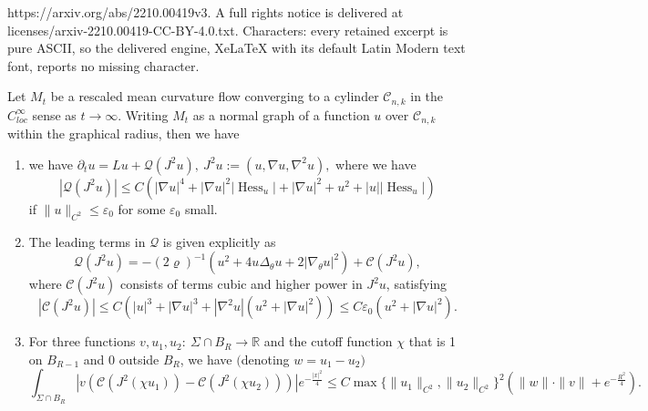 \documentclass[10pt,a4paper]{amsart}
\DeclareMathOperator{\Hess}{Hess}
\newcommand{\R}{\mathbb{R}}
\newcommand{\cC}{\mathcal{C}}
\newcommand{\cQ}{\mathcal{Q}}
\newcommand{\eps}{\varepsilon}
\begin{document}
https://arxiv.org/abs/2210.00419v3. A full rights notice is delivered at licenses/arxiv-2210.00419-CC-BY-4.0.txt. Characters: every retained excerpt is pure ASCII, so the delivered engine, XeLaTeX with its default Latin Modern text font, reports no missing character.
	\begin{proposition}\label{PropQ}Let $M_t$ be a rescaled mean curvature flow converging to a cylinder $\cC_{n,k}$ in the $C^\infty_{loc}$ sense as $t\to\infty$. Writing $M_t$ as a normal graph of a function $u$ over $\cC_{n,k}$ within the graphical radius, then we have  
		\begin{enumerate}
			\item 	we have
			$\partial_tu=L u+\cQ(J^2u),\ J^2u:=(u,\nabla u, \nabla^2u),$
			where we have 	\begin{equation}\label{EqQ<}
				|\cQ(J^2u)|\leq 
				C(|\nabla u|^4+|\nabla u|^2|\Hess_u|+|\nabla u|^2+u^2+|u||\Hess_u|)
			\end{equation}
			if $\|u\|_{C^2}\leq \eps_0$ for some $\eps_0$ small. 
			\item 	The leading terms in $\cQ$ is given explicitly as 
			\begin{equation}\label{EqQ}
				\cQ(J^2u)=-(2\varrho)^{-1}\left(u^2+4u\Delta_\theta u+2|\nabla_\theta u|^2\right) +\cC(J^2u),	
			\end{equation}
			where $\cC(J^2u)$ consists of terms cubic and higher power in $J^2u$, satisfying
			\begin{equation}
				|\cC(J^2u)|\leq C(|u|^3+|\nabla u|^3+|\nabla^2u|(u^2+|\nabla u|^2))\leq C\eps_0(u^2+|\nabla u|^2).
			\end{equation} 
			\item For three functions $v, u_1,u_2:\ \Sigma\cap B_R\to \R$ and the cutoff function $\chi$ that is 1 on $B_{R-1}$ and $0$ outside $B_R$, we have $($denoting $w=u_1-u_2)$\begin{equation*}\label{EqdC}
				\int_{\Sigma\cap B_R} |v 	(\cC(J^2(\chi u_1))-	\cC(J^2(\chi u_2)))|e^{-\frac{|x|^2}{4}}\leq C\max\{\|u_1\|_{C^2},\|u_2\|_{C^2}\}^2(\|w\|\cdot \|v\|+e^{-\frac{R^2}{4}}).
			\end{equation*}
		\end{enumerate}
		
		
		
	\end{proposition}
\end{document}
